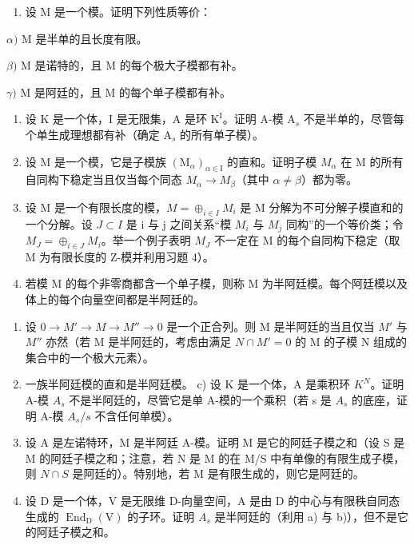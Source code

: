 \begin{enumerate}
\def\labelenumi{\arabic{enumi})}
\setcounter{enumi}{1}
\tightlist
\item
  设 M 是一个模。证明下列性质等价：
\end{enumerate}

\(\alpha)\) M 是半单的且长度有限。

\(\beta)\) M 是诺特的，且 M 的每个极大子模都有补。

\(\gamma)\) M 是阿廷的，且 M 的每个单子模都有补。

\begin{enumerate}
\def\labelenumi{\arabic{enumi})}
\setcounter{enumi}{2}
\item
  设 \(\mathrm{K}\) 是一个体，I 是无限集，A 是环 \(\mathrm{K}^{\mathrm{I}}\)。证明 A-模 \(\mathrm{A}_s\) 不是半单的，尽管每个单生成理想都有补（确定 \(\mathrm{A}_s\) 的所有单子模）。
\item
  设 M 是一个模，它是子模族 \((\mathrm{M}_{\alpha})_{\alpha\in\mathrm{I}}\) 的直和。证明子模 \(M_{\alpha}\) 在 M 的所有自同构下稳定当且仅当每个同态 \(M_{\alpha}\to M_{\beta}\)（其中 \(\alpha\neq\beta\)）都为零。
\item
  设 M 是一个有限长度的模，\(M = \oplus_{i \in I} M_i\) 是 M 分解为不可分解子模直和的一个分解。设 \(J \subset I\) 是 i 与 j 之间关系“模 \(M_i\) 与 \(M_j\) 同构”的一个等价类；令 \(M_J = \oplus_{i \in J} M_i\)。举一个例子表明 \(M_J\) 不一定在 M 的每个自同构下稳定（取 M 为有限长度的 Z-模并利用习题 4）。
\item
  若模 M 的每个非零商都含一个单子模，则称 M 为半阿廷模。每个阿廷模以及体上的每个向量空间都是半阿廷的。
\end{enumerate}

\begin{enumerate}
\def\labelenumi{\alph{enumi})}
\item
  设 \(0 \rightarrow M' \rightarrow M \rightarrow M'' \rightarrow 0\) 是一个正合列。则 M 是半阿廷的当且仅当 \(M'\) 与 \(M''\) 亦然（若 M 是半阿廷的，考虑由满足 \(N \cap M' = 0\) 的 M 的子模 N 组成的集合中的一个极大元素）。
\item
  一族半阿廷模的直和是半阿廷模。 c) 设 K 是一个体，A 是乘积环 \(K^{N}\)。证明 A-模 \(A_{s}\) 不是半阿廷的，尽管它是单 A-模的一个乘积（若 s 是 \(A_{s}\) 的底座，证明 A-模 \(A_{s}/s\) 不含任何单模）。
\item
  设 A 是左诺特环，M 是半阿廷 A-模。证明 M 是它的阿廷子模之和（设 S 是 M 的阿廷子模之和；注意，若 N 是 M 的在 M/S 中有单像的有限生成子模，则 \(N \cap S\) 是阿廷的）。特别地，若 M 是有限生成的，则它是阿廷的。
\item
  设 D 是一个体，V 是无限维 D-向量空间，A 是由 D 的中心与有限秩自同态生成的 \(\operatorname{End}_{\mathrm{D}}(\mathrm{V})\) 的子环。证明 \(A_{s}\) 是半阿廷的（利用 a) 与 b)），但不是它的阿廷子模之和。
\end{enumerate}

